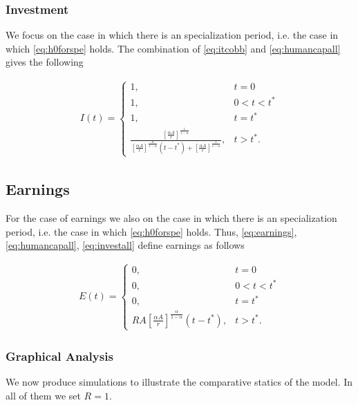 \subsubsection{Investment}
We focus on the case in which there is an specialization period, i.e. the case in which \eqref{eq:h0forspe} holds. The combination of \eqref{eq:itcobb} and \eqref{eq:humancapall} gives the following

\begin{eqnarray}
I(t) =
\begin{cases}
1, & t = 0 \\
1, & 0 < t < t^* \\
1, & t = t^* \\
\frac{\left[ \frac{\alpha A}{r} \right]^{\frac{1}{1 - \alpha}}}{\left[ \frac{\alpha A}{r} \right]^{\frac{ \alpha }{1 - \alpha}} \left( t - t^* \right) + \left[ \frac{\alpha A}{r} \right]^{\frac{1}{1 - \alpha}}}, & t > t^*. \label{eq:investall}
\end{cases}
\end{eqnarray}

\subsection{Earnings}
For the case of earnings we also on the case in which there is an specialization period, i.e. the case in which \eqref{eq:h0forspe} holds. Thus, \eqref{eq:earnings}, \eqref{eq:humancapall}, \eqref{eq:investall} define earnings as follows

\begin{eqnarray}
E(t) =
\begin{cases}
0, & t = 0 \\
0, & 0 < t < t^* \\
0, & t = t^* \\
RA \left[ \frac{\alpha A}{r} \right]^{\frac{\alpha}{1 - \alpha}} \left( t - t^* \right) , & t > t^*. \label{eq:earnsall}
\end{cases}
\end{eqnarray}

\subsubsection{Graphical Analysis}
We now produce simulations to illustrate the comparative statics of the model. In all of them we set $R=1$.

